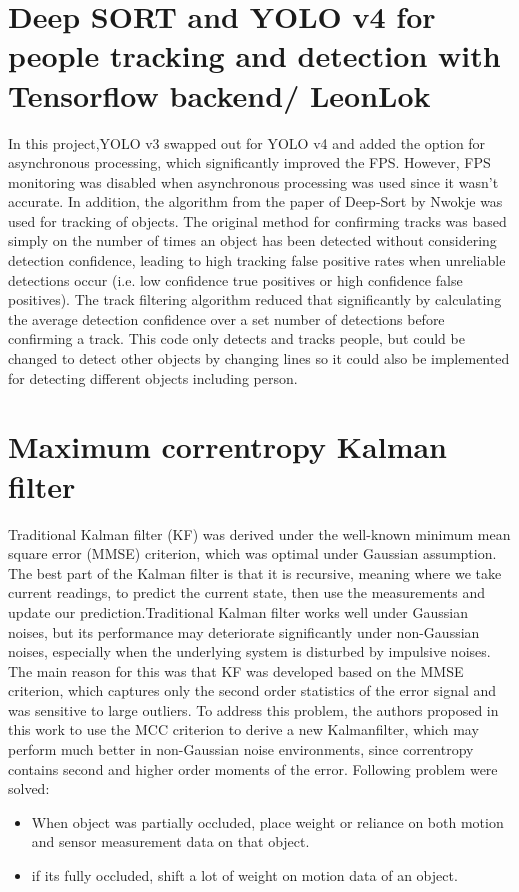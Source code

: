     \section{Deep SORT and YOLO v4 for people tracking and detection with Tensorflow backend/ LeonLok}
        In this project,YOLO v3 swapped out  for YOLO v4 and added the option for asynchronous processing, which significantly improved the FPS. However, FPS monitoring was disabled when asynchronous processing was used since it wasn't accurate. In addition, the algorithm from the paper of Deep-Sort by Nwokje was used for tracking of objects. The original method for confirming tracks was based simply on the number of times an object has been detected without considering detection confidence, leading to high tracking false positive rates when unreliable detections occur (i.e. low confidence true positives or high confidence false positives). The track filtering algorithm reduced that significantly by calculating the average detection confidence over a set number of detections before confirming a track. This code only detects and tracks people, but could be changed to detect other objects by changing lines so it could also be implemented for detecting different objects including person.

        \section{Maximum correntropy Kalman filter}
        Traditional Kalman filter (KF) was derived under the well-known minimum mean square error (MMSE) criterion, which was optimal under Gaussian assumption.\cite{chen2017maximum} The best part of the Kalman filter is that it is recursive, meaning where we take current readings, to predict the current state, then use the measurements and update our prediction.Traditional Kalman filter works well under Gaussian noises, but its performance may deteriorate significantly under non-Gaussian noises, especially when the underlying system is disturbed by impulsive noises. The main reason for this was that KF was developed based on the MMSE criterion, which captures only the second order statistics of the error signal and was sensitive to large outliers. To address this problem, the authors proposed in this work to use the MCC criterion to derive a new Kalmanfilter, which may perform much better in non-Gaussian noise environments, since correntropy contains second and higher order moments of the error. Following problem were solved:            
        \begin{itemize}
            \item When object was partially occluded, place weight or reliance on both motion and sensor measurement data on that object.
            \item if its fully occluded, shift a lot of weight on motion data of an object.
        \end{itemize}